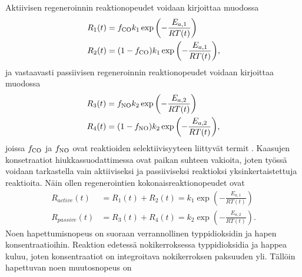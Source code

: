 Aktiivisen regeneroinnin reaktionopeudet voidaan kirjoittaa muodossa
\begin{align}
    R_1(t) &= f_{\ce{CO}} k_1 \exp{\left( -\frac{E_{a, 1}}{RT(t)} \right)} \\%
    R_2(t) &= (1-f_{\ce{CO}}) k_1 \exp{\left( -\frac{E_{a, 1}}{RT(t)} \right)} ,%
\end{align}
ja vastaavasti passiivisen regeneroinnin reaktionopeudet voidaan kirjoittaa muodossa
\begin{align}
    R_3(t) &= f_{\ce{NO}} k_2 \exp{\left( -\frac{E_{a, 2}}{RT(t)} \right)} \\%
    R_4(t) &= (1-f_{\ce{NO}}) k_2 \exp{\left( -\frac{E_{a, 2}}{RT(t)} \right)}, %
\end{align}
joissa \( f_{\ce{CO}}\) ja \( f_{\ce{NO}}\) ovat reaktioiden selektiivisyyteen liittyvät termit \cite{ZhongChao2022Eaos} \cite{DengYuanwang2017Iogc}.
Kaasujen konsetraatiot hiukkassuodattimessa ovat paikan suhteen vakioita, joten työssä voidaan tarkastella vain aktiiviseksi ja passiiviseksi reaktioksi yksinkertaistettuja reaktioita.
Näin ollen regenerointien kokonaisreaktionopeudet ovat
\begin{align}
    R_{active}(t) &= R_1(t) + R_2(t) =   k_1 \exp{\left( -\frac{E_{a, 1}}{RT(t)} \right)} \\%
    R_{passive}(t) &= R_3(t)+ R_4(t) =  k_2 \exp{\left( -\frac{E_{a, 2}}{RT(t)} \right)} . %
\end{align}
Noen hapettumisnopeus on suoraan verrannollinen typpidioksidin ja hapen konsentraatioihin. Reaktion edetessä nokikerroksessa typpidioksidia ja happea kuluu, joten konsentraatiot on integroitava nokikerroksen paksuuden yli. Tällöin hapettuvan noen muutosnopeus on

